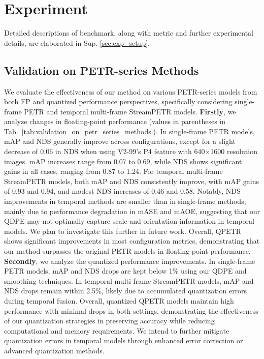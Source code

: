 \section{Experiment}

Detailed descriptions of benchmark, along with metric and further experimental details, are elaborated in Sup. \ref{sec:exp_setup}.

\subsection{Validation on PETR-series Methods}\label{sec:sota_exp}
We evaluate the effectiveness of our method on various PETR-series models from both FP and quantized performance perspectives, specifically considering single-frame PETR and temporal multi-frame StreamPETR models. \textbf{Firstly}, we analyze changes in floating-point performance (values in parentheses in Tab.~\ref{tab:validation_on_petr_series_methods}). In single-frame PETR models, mAP and NDS generally improve across configurations, except for a slight decrease of 0.06 in NDS when using V2-99’s P4 feature with 640×1600 resolution images. mAP increases range from 0.07 to 0.69, while NDS shows significant gains in all cases, ranging from 0.87 to 1.24. For temporal multi-frame StreamPETR models, both mAP and NDS consistently improve, with mAP gains of 0.93 and 0.94, and modest NDS increases of 0.46 and 0.58. Notably, NDS improvements in temporal methods are smaller than in single-frame methods, mainly due to performance degradation in mASE and mAOE, suggesting that our QDPE may not optimally capture scale and orientation information in temporal models. We plan to investigate this further in future work. Overall, QPETR shows significant improvements in most configuration metrics, demonstrating that our method surpasses the original PETR models in floating-point performance. \textbf{Secondly}, we analyze the quantized performance improvements. In single-frame PETR models, mAP and NDS drops are kept below 1\% using our QDPE and smoothing techniques. In temporal multi-frame StreamPETR models, mAP and NDS drops remain within 2.5\%, likely due to accumulated quantization errors during temporal fusion. Overall, quantized QPETR models maintain high performance with minimal drops in both settings, demonstrating the effectiveness of our quantization strategies in preserving accuracy while reducing computational and memory requirements. We intend to further mitigate quantization errors in temporal models through enhanced error correction or advanced quantization methods.

